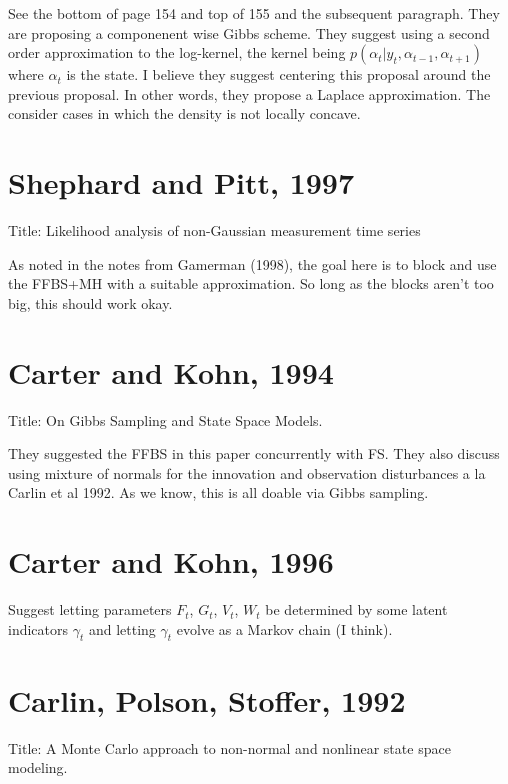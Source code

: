 \documentclass{article}
\begin{document}
See the bottom of page 154 and top of 155 and the subsequent paragraph.  They
are proposing a componenent wise Gibbs scheme.  They suggest using a second
order approximation to the log-kernel, the kernel being $p(\alpha_t | y_t,
\alpha_{t-1}, \alpha_{t+1})$ where $\alpha_t$ is the state.  I believe they
suggest centering this proposal around the previous proposal.  In other words,
they propose a Laplace approximation.  The consider cases in which the density
is not locally concave.

\section{Shephard and Pitt, 1997}

Title: Likelihood analysis of non-Gaussian measurement time series

As noted in the notes from Gamerman (1998), the goal here is to block and use
the FFBS+MH with a suitable approximation.  So long as the blocks aren't too
big, this should work okay.

\section{Carter and Kohn, 1994}

Title: On Gibbs Sampling and State Space Models.

They suggested the FFBS in this paper concurrently with FS.  They also discuss
using mixture of normals for the innovation and observation disturbances a la
Carlin et al 1992.  As we know, this is all doable via Gibbs sampling.

\section{Carter and Kohn, 1996}

Suggest letting parameters $F_t$, $G_t$, $V_t$, $W_t$ be determined by some
latent indicators $\gamma_t$ and letting $\gamma_t$ evolve as a Markov chain (I
think).

\section{Carlin, Polson, Stoffer, 1992}

Title: A Monte Carlo approach to non-normal and nonlinear state space modeling.
\end{document}
